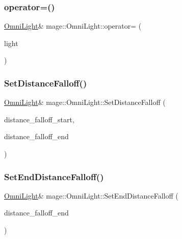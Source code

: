 \subsubsection{\texorpdfstring{operator=()}{operator=()}\hspace{0.1cm}{\footnotesize\ttfamily [2/2]}}
{\footnotesize\ttfamily \hyperlink{classmage_1_1_omni_light}{Omni\+Light}\& mage\+::\+Omni\+Light\+::operator= (\begin{DoxyParamCaption}\item[{\hyperlink{classmage_1_1_omni_light}{Omni\+Light} \&\&}]{light }\end{DoxyParamCaption})\hspace{0.3cm}{\ttfamily [delete]}}

\hypertarget{classmage_1_1_omni_light_a148c13f7b6191c88f069730777d31eb3}{}\label{classmage_1_1_omni_light_a148c13f7b6191c88f069730777d31eb3} 
\subsubsection{\texorpdfstring{Set\+Distance\+Falloff()}{SetDistanceFalloff()}}
{\footnotesize\ttfamily \hyperlink{classmage_1_1_omni_light}{Omni\+Light}\& mage\+::\+Omni\+Light\+::\+Set\+Distance\+Falloff (\begin{DoxyParamCaption}\item[{float}]{distance\+\_\+falloff\+\_\+start,  }\item[{float}]{distance\+\_\+falloff\+\_\+end }\end{DoxyParamCaption})}

\hypertarget{classmage_1_1_omni_light_a45990ae06ca074654247d70f85e98094}{}\label{classmage_1_1_omni_light_a45990ae06ca074654247d70f85e98094} 
\subsubsection{\texorpdfstring{Set\+End\+Distance\+Falloff()}{SetEndDistanceFalloff()}}
{\footnotesize\ttfamily \hyperlink{classmage_1_1_omni_light}{Omni\+Light}\& mage\+::\+Omni\+Light\+::\+Set\+End\+Distance\+Falloff (\begin{DoxyParamCaption}\item[{float}]{distance\+\_\+falloff\+\_\+end }\end{DoxyParamCaption})}

